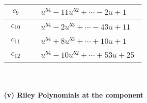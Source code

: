 \documentclass[1p]{elsarticle_modified}
\theoremstyle{definition}
\begin{document}
\begin{tabular}{m{50pt}|m{274pt}}
\hline $$\begin{aligned}c_{9}\end{aligned}$$&$\begin{aligned}
&u^{54}-11 u^{52}+\cdots-2 u+1
\end{aligned}$\\
\hline $$\begin{aligned}c_{10}\end{aligned}$$&$\begin{aligned}
&u^{54}-2 u^{53}+\cdots-43 u+11
\end{aligned}$\\
\hline $$\begin{aligned}c_{11}\end{aligned}$$&$\begin{aligned}
&u^{54}+8 u^{53}+\cdots+10 u+1
\end{aligned}$\\
\hline $$\begin{aligned}c_{12}\end{aligned}$$&$\begin{aligned}
&u^{54}-10 u^{52}+\cdots+53 u+25
\end{aligned}$\\
\hline
\end{tabular}\\~\\
\newpage\renewcommand{\arraystretch}{1}
\flushleft \textbf{(v) Riley Polynomials at the component}\newline \\
\end{document}
